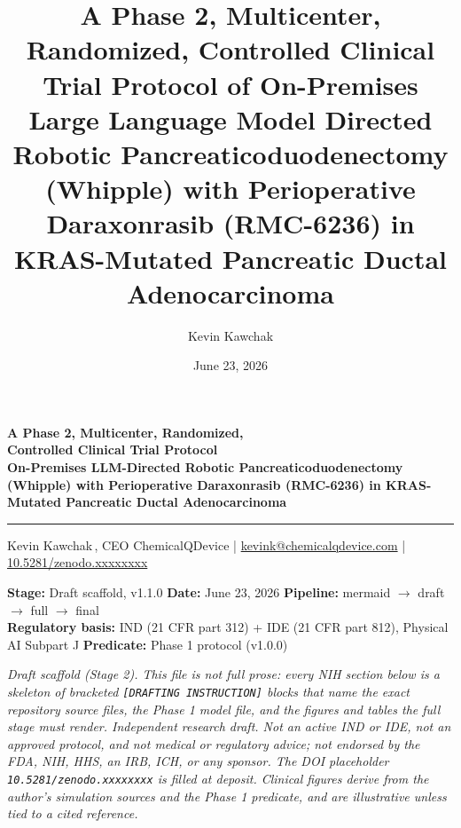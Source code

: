 \documentclass[11pt]{article}
\title{A Phase 2, Multicenter, Randomized, Controlled Clinical Trial Protocol of
On-Premises Large Language Model Directed Robotic Pancreaticoduodenectomy
(Whipple) with Perioperative Daraxonrasib (RMC-6236) in KRAS-Mutated Pancreatic
Ductal Adenocarcinoma}
\author{Kevin Kawchak}
\date{June 23, 2026}
\begin{document}
\thispagestyle{plain}

\begin{center}
{\LARGE\bfseries\color{accentcol} A Phase 2, Multicenter, Randomized,\\Controlled Clinical Trial Protocol}\\[0.4em]
{\large\bfseries On-Premises LLM-Directed Robotic Pancreaticoduodenectomy
(Whipple) with Perioperative Daraxonrasib (RMC-6236) in KRAS-Mutated Pancreatic
Ductal Adenocarcinoma}\\[0.3em]
{\color{accentcol}\rule{\linewidth}{1.2pt}}
\end{center}

\begin{center}\small
Kevin Kawchak\,, CEO ChemicalQDevice \;|\;
\href{mailto:kevink@chemicalqdevice.com}{kevink@chemicalqdevice.com} \;|\;
\href{https://doi.org/10.5281/zenodo.xxxxxxxx}{10.5281/zenodo.xxxxxxxx}
\end{center}

\begin{center}\footnotesize
\textbf{Stage:} Draft scaffold, v1.1.0 \quad
\textbf{Date:} June 23, 2026 \quad
\textbf{Pipeline:} mermaid $\rightarrow$ draft $\rightarrow$ full $\rightarrow$ final \\
\textbf{Regulatory basis:} IND (21 CFR part 312) + IDE (21 CFR part 812),
Physical AI Subpart J \quad \textbf{Predicate:} Phase 1 protocol (v1.0.0)
\end{center}

\noindent\footnotesize\textit{Draft scaffold (Stage 2). This file is not full
prose: every NIH section below is a skeleton of bracketed \texttt{[DRAFTING
INSTRUCTION]} blocks that name the exact repository source files, the Phase 1
model file, and the figures and tables the full stage must render. Independent
research draft. Not an active IND or IDE, not an approved protocol, and not
medical or regulatory advice; not endorsed by the FDA, NIH, HHS, an IRB, ICH, or
any sponsor. The DOI placeholder \texttt{10.5281/zenodo.xxxxxxxx} is filled at
deposit. Clinical figures derive from the author's simulation sources and the
Phase 1 predicate, and are illustrative unless tied to a cited
reference.}\normalsize\par

\renewcommand{\keywordname}{\textbf{Keywords}}
\end{document}
